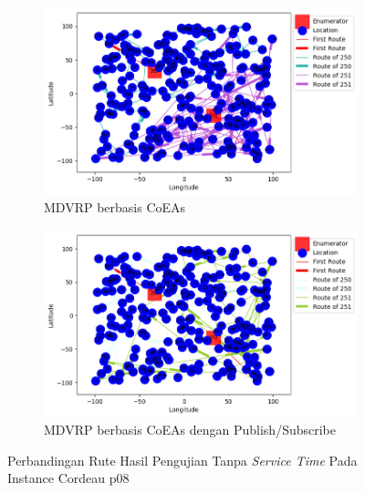 \begin{figure}[H]
	\centering
	\begin{subfigure}[t]{\textwidth}
		\centering
		\includegraphics[width=\textwidth]{Resources/Images/cordeau_p08/cordeau_p08_notw_coes}
		\caption{MDVRP berbasis CoEAs}
		\label{fig:cordeau_p08_notw_coes}
	\end{subfigure}
	\begin{subfigure}[t]{\textwidth}
		\centering
		\includegraphics[width=\textwidth]{Resources/Images/cordeau_p08/cordeau_p08_notw_pubsub_coes}
		\caption{MDVRP berbasis CoEAs dengan Publish/Subscribe}
		\label{fig:cordeau_p08_notw_pubsub_coes}
	\end{subfigure}
	\caption{Perbandingan Rute Hasil Pengujian Tanpa \textit{Service Time} Pada Instance Cordeau p08}
	\label{fig:cordeau_p08_notw}
\end{figure}


